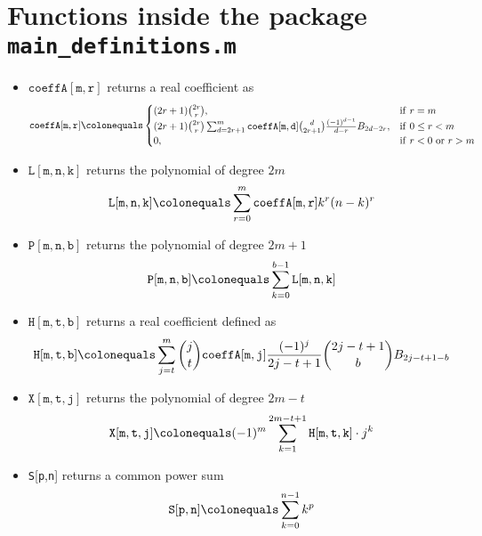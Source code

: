 \documentclass[12pt, letterpaper]{amsart}
\newenvironment{myitemize}
{ \begin{itemize}
    \setlength{\itemsep}{4pt}
    \setlength{\parskip}{4pt}
    \setlength{\parsep}{4pt}     }
{ \end{itemize}                  }
\newcommand \coeffA [3][coeffA]{\texttt{#1}[{\texttt{#2}},{\texttt{#3}}]}
\newcommand \coeffH [4][H]{\texttt{#1}[{\texttt{#2}},{\texttt{#3}},{\texttt{#4}}]}
\newcommand \polL [4][L]{\texttt{{#1}} [{\texttt{#2}},{\texttt{#3}},{\texttt{#4}}]}
\newcommand \polP [4][P]{\texttt{{#1}} [{\texttt{#2}},{\texttt{#3}},{\texttt{#4}}]}
\newcommand \coeffX [4][X]{\texttt{#1}[{\texttt{#2}},{\texttt{#3}},{\texttt{#4}}]}
\newcommand \commonPowSum [3][S]{\texttt{#1}[{\texttt{#2}},{\texttt{#3}}]}
\theoremstyle{definition}
\theoremstyle{remark}
\numberwithin{equation}{section}
\begin{document}
\section{Functions inside the package \texttt{main\_definitions.m}}
\begin{myitemize}
\item $\coeffA{m}{r}$ returns a real coefficient as
\begin{equation*}
\coeffA{m}{r} \colonequals
\begin{cases}
(2r+1)\binom{2r}{r}, & \mathrm{if } \ r=m \\
(2r+1)\binom{2r}{r} \sum_{d=2r+1}^{m} \coeffA{m}{d} \binom{d}{2r+1} \frac{(-1)^{d-1}}{d-r} B_{2d-2r}, & \mathrm{if } \ 0 \leq r < m \\
0, & \mathrm{if } \ r<0 \ \mathrm{or } \ r>m
\end{cases}
\end{equation*}
\item $\polL{m}{n}{k}$ returns the  polynomial of degree $2m$
\begin{equation*}
\polL{m}{n}{k} \colonequals \sum_{r=0}^{m} \coeffA{m}{r} k^r(n-k)^r
\end{equation*}
\item $\polP{m}{n}{b}$ returns the polynomial of degree $2m+1$
\begin{equation*}
\label{p_definition}
\polP{m}{n}{b} \colonequals \sum_{k=0}^{b-1} \polL{m}{n}{k}
\end{equation*}
\item $\coeffH{m}{t}{b}$ returns a real coefficient defined as
\begin{equation*}
\coeffH{m}{t}{b} \colonequals \sum_{j=t}^{m} \binom{j}{t} \coeffA{m}{j} \frac{(-1)^j}{2j-t+1} \binom{2j-t+1}{b} B_{2j-t+1-b}
\end{equation*}
\item $\coeffX{m}{t}{j}$ returns the polynomial of degree $2m-t$
\begin{equation*}
\coeffX{m}{t}{j} \colonequals (-1)^m \sum_{k=1}^{2m-t+1} \coeffH{m}{t}{k} \cdot j^k
\end{equation*}
\item \commonPowSum{p}{n} returns a common power sum
\begin{equation*}
\commonPowSum{p}{n} \colonequals \sum_{k=0}^{n-1} k^p
\end{equation*}


\end{myitemize}
\end{document}
